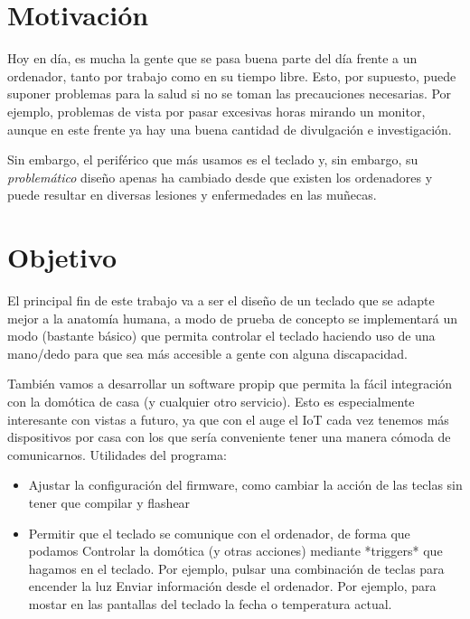\section{Motivación}
Hoy en día, es mucha la gente que se pasa buena parte del día frente a un ordenador, tanto por trabajo como en su tiempo libre. Esto, por supuesto, puede suponer problemas para la salud si no se toman las precauciones necesarias. Por ejemplo, problemas de vista por pasar excesivas horas mirando un monitor, aunque en este frente ya hay una buena cantidad de divulgación e investigación.

Sin embargo, el periférico que más usamos es el teclado y, sin embargo, su \emph{problemático} diseño apenas ha cambiado desde que existen los ordenadores y puede resultar en diversas lesiones y enfermedades en las muñecas.

\section{Objetivo}
El principal fin de este trabajo va a ser el diseño de un teclado que se adapte mejor a la anatomía humana, a modo de prueba de concepto se implementará un modo (bastante básico) que permita controlar el teclado haciendo uso de una mano/dedo para que sea más accesible a gente con alguna discapacidad.

También vamos a desarrollar un software propip que permita la fácil integración con la domótica\cite{home-assistant} de casa (y cualquier otro servicio). Esto es especialmente interesante con vistas a futuro, ya que con el auge el IoT cada vez tenemos más dispositivos por casa con los que sería conveniente tener una manera cómoda de comunicarnos. Utilidades del programa:
\begin{itemize}
    \item Ajustar la configuración del firmware, como cambiar la acción de las teclas sin tener que compilar y flashear 
    \item Permitir que el teclado se comunique con el ordenador, de forma que podamos
      \subitem Controlar la domótica (y otras acciones) mediante *triggers* que hagamos en el teclado. Por ejemplo, pulsar una combinación de teclas para encender la luz
      \subitem Enviar información desde el ordenador. Por ejemplo, para mostar en las pantallas del teclado la fecha o temperatura actual.
\end{itemize}
